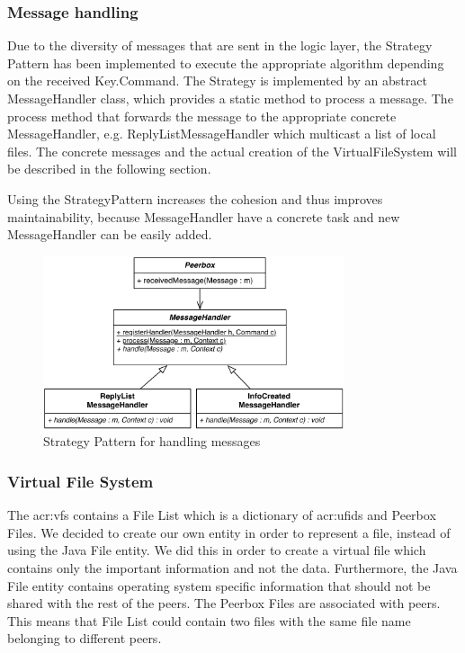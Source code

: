 \subsubsection{Message handling}
Due to the diversity of messages that are sent in the logic layer, the Strategy Pattern has been implemented to execute the appropriate algorithm depending on the received Key.Command. The Strategy is implemented by an abstract MessageHandler class, which provides a static method to process a message. The process method that forwards the message to the appropriate concrete MessageHandler, e.g. ReplyListMessageHandler which multicast a list of local files. The concrete messages and the actual creation of the VirtualFileSystem will be described in the following section. 

Using the StrategyPattern increases the cohesion and thus improves maintainability, because MessageHandler have a concrete task and new MessageHandler can be easily added.

\begin{figure}[htbp]
\centering
\includegraphics[height=2in]{figures/mhStrategy.pdf}
\caption{Strategy Pattern for handling messages}
\label{fig:figures_mhStrategy}
\end{figure}


\subsubsection{Virtual File System}
    
The \gls{acr:vfs} contains a File List which is a dictionary of \glspl{acr:ufid} and Peerbox Files. We decided to create our own entity in order to represent a file, instead of using the Java File entity. We did this in order to create a virtual file which contains only the important information and not the data. Furthermore, the Java File entity contains operating system specific information that should not be shared with the rest of the peers. The Peerbox Files are associated with peers. This means that File List could contain two files with the same file name belonging to different peers.
    
